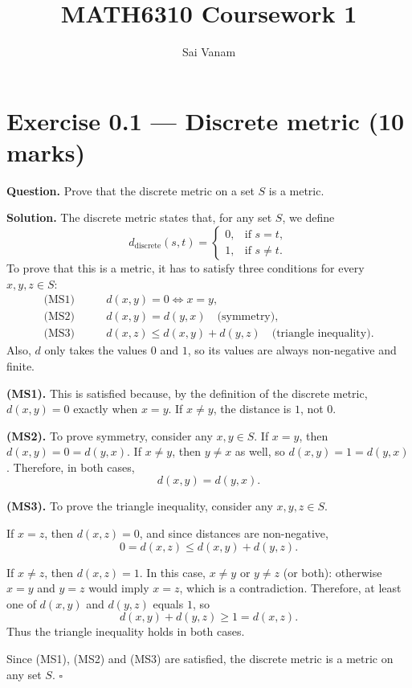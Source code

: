 \documentclass[11pt,a4paper]{article}
\title{\textbf{MATH6310 Coursework 1}}
\author{Sai Vanam}
\date{}
\begin{document}
\maketitle
\vspace{-1.5em}

\section*{Exercise 0.1 --- Discrete metric \hfill \normalsize (10 marks)}
\textbf{Question.} Prove that the discrete metric on a set $S$ is a metric.

\textbf{Solution.}
The discrete metric states that, for any set $S$, we define
\[
 d_{\mathrm{discrete}}(s,t)=
 \begin{cases}
 0, & \text{if }s=t,\\
 1, & \text{if }s\ne t.
 \end{cases}
\]
To prove that this is a metric, it has to satisfy three conditions for every $x,y,z\in S$:
\begin{align*}
\text{(MS1)}\qquad &d(x,y)=0\iff x=y,\\
\text{(MS2)}\qquad &d(x,y)=d(y,x)\quad\text{(symmetry)},\\
\text{(MS3)}\qquad &d(x,z)\le d(x,y)+d(y,z)\quad\text{(triangle inequality)}.
\end{align*}
Also, $d$ only takes the values $0$ and $1$, so its values are always non-negative and finite.

\textbf{(MS1).} This is satisfied because, by the definition of the discrete metric, $d(x,y)=0$ exactly when $x=y$. If $x\ne y$, the distance is $1$, not $0$.

\textbf{(MS2).} To prove symmetry, consider any $x,y\in S$.
If $x=y$, then $d(x,y)=0=d(y,x)$.
If $x\ne y$, then $y\ne x$ as well, so $d(x,y)=1=d(y,x)$.
Therefore, in both cases,
\[
 d(x,y)=d(y,x).
\]

\textbf{(MS3).} To prove the triangle inequality, consider any $x,y,z\in S$.

If $x=z$, then $d(x,z)=0$, and since distances are non-negative,
\[
 0=d(x,z)\le d(x,y)+d(y,z).
\]

If $x\ne z$, then $d(x,z)=1$. In this case, $x\ne y$ or $y\ne z$ (or both): otherwise $x=y$ and $y=z$ would imply $x=z$, which is a contradiction. Therefore, at least one of $d(x,y)$ and $d(y,z)$ equals $1$, so
\[
 d(x,y)+d(y,z)\ge 1=d(x,z).
\]
Thus the triangle inequality holds in both cases.

Since (MS1), (MS2) and (MS3) are satisfied, the discrete metric is a metric on any set $S$. \(\square\)
\end{document}
